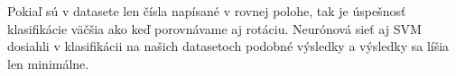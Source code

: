 Pokiaľ sú v datasete len čísla napísané v rovnej polohe, tak je úspešnosť klasifikácie väčšia ako keď porovnávame aj rotáciu. Neurónová sieť aj SVM dosiahli v klasifikácii na našich datasetoch podobné výsledky a výsledky sa líšia len minimálne.

